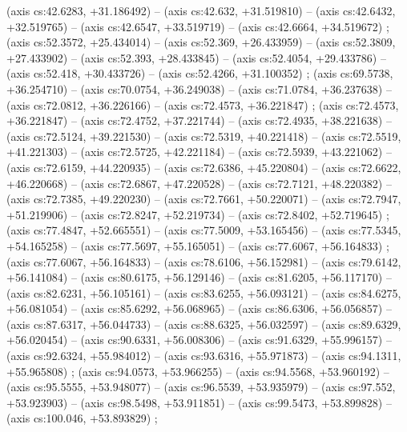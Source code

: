     (axis cs:42.6283,    +31.186492) --  (axis cs:42.632,    +31.519810) --  (axis cs:42.6432,    +32.519765) --  (axis cs:42.6547,    +33.519719) --  (axis cs:42.6664,    +34.519672) ;
    (axis cs:52.3572,    +25.434014) --  (axis cs:52.369,    +26.433959) --  (axis cs:52.3809,    +27.433902) --  (axis cs:52.393,    +28.433845) --  (axis cs:52.4054,    +29.433786) --  (axis cs:52.418,    +30.433726) --  (axis cs:52.4266,    +31.100352) ;
    (axis cs:69.5738,    +36.254710) --  (axis cs:70.0754,    +36.249038) --  (axis cs:71.0784,    +36.237638) --  (axis cs:72.0812,    +36.226166) --  (axis cs:72.4573,    +36.221847) ;
    (axis cs:72.4573,    +36.221847) --  (axis cs:72.4752,    +37.221744) --  (axis cs:72.4935,    +38.221638) --  (axis cs:72.5124,    +39.221530) --  (axis cs:72.5319,    +40.221418) --  (axis cs:72.5519,    +41.221303) --  (axis cs:72.5725,    +42.221184) --  (axis cs:72.5939,    +43.221062) --  (axis cs:72.6159,    +44.220935) --  (axis cs:72.6386,    +45.220804) --  (axis cs:72.6622,    +46.220668) --  (axis cs:72.6867,    +47.220528) --  (axis cs:72.7121,    +48.220382) --  (axis cs:72.7385,    +49.220230) --  (axis cs:72.7661,    +50.220071) --  (axis cs:72.7947,    +51.219906) --  (axis cs:72.8247,    +52.219734) --  (axis cs:72.8402,    +52.719645) ;
    (axis cs:77.4847,    +52.665551) --  (axis cs:77.5009,    +53.165456) --  (axis cs:77.5345,    +54.165258) --  (axis cs:77.5697,    +55.165051) --  (axis cs:77.6067,    +56.164833) ;
    (axis cs:77.6067,    +56.164833) --  (axis cs:78.6106,    +56.152981) --  (axis cs:79.6142,    +56.141084) --  (axis cs:80.6175,    +56.129146) --  (axis cs:81.6205,    +56.117170) --  (axis cs:82.6231,    +56.105161) --  (axis cs:83.6255,    +56.093121) --  (axis cs:84.6275,    +56.081054) --  (axis cs:85.6292,    +56.068965) --  (axis cs:86.6306,    +56.056857) --  (axis cs:87.6317,    +56.044733) --  (axis cs:88.6325,    +56.032597) --  (axis cs:89.6329,    +56.020454) --  (axis cs:90.6331,    +56.008306) --  (axis cs:91.6329,    +55.996157) --  (axis cs:92.6324,    +55.984012) --  (axis cs:93.6316,    +55.971873) --  (axis cs:94.1311,    +55.965808) ;
    (axis cs:94.0573,    +53.966255) --  (axis cs:94.5568,    +53.960192) --  (axis cs:95.5555,    +53.948077) --  (axis cs:96.5539,    +53.935979) --  (axis cs:97.552,    +53.923903) --  (axis cs:98.5498,    +53.911851) --  (axis cs:99.5473,    +53.899828) --  (axis cs:100.046,    +53.893829) ;
